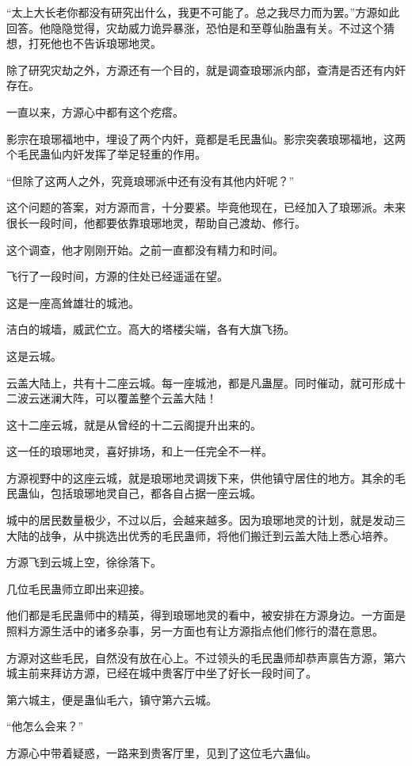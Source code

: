 \begin{this_body}
“太上大长老你都没有研究出什么，我更不可能了。总之我尽力而为罢。”方源如此回答。他隐隐觉得，灾劫威力诡异暴涨，恐怕是和至尊仙胎蛊有关。不过这个猜想，打死他也不告诉琅琊地灵。

除了研究灾劫之外，方源还有一个目的，就是调查琅琊派内部，查清是否还有内奸存在。

一直以来，方源心中都有这个疙瘩。

影宗在琅琊福地中，埋设了两个内奸，竟都是毛民蛊仙。影宗突袭琅琊福地，这两个毛民蛊仙内奸发挥了举足轻重的作用。

“但除了这两人之外，究竟琅琊派中还有没有其他内奸呢？”

这个问题的答案，对方源而言，十分要紧。毕竟他现在，已经加入了琅琊派。未来很长一段时间，他都要依靠琅琊地灵，帮助自己渡劫、修行。

这个调查，他才刚刚开始。之前一直都没有精力和时间。

飞行了一段时间，方源的住处已经遥遥在望。

这是一座高耸雄壮的城池。

洁白的城墙，威武伫立。高大的塔楼尖端，各有大旗飞扬。

这是云城。

云盖大陆上，共有十二座云城。每一座城池，都是凡蛊屋。同时催动，就可形成十二波云迷澜大阵，可以覆盖整个云盖大陆！

这十二座云城，就是从曾经的十二云阁提升出来的。

这一任的琅琊地灵，喜好排场，和上一任完全不一样。

方源视野中的这座云城，就是琅琊地灵调拨下来，供他镇守居住的地方。其余的毛民蛊仙，包括琅琊地灵自己，都各自占据一座云城。

城中的居民数量极少，不过以后，会越来越多。因为琅琊地灵的计划，就是发动三大陆的战争，从中挑选出优秀的毛民蛊师，将他们搬迁到云盖大陆上悉心培养。

方源飞到云城上空，徐徐落下。

几位毛民蛊师立即出来迎接。

他们都是毛民蛊师中的精英，得到琅琊地灵的看中，被安排在方源身边。一方面是照料方源生活中的诸多杂事，另一方面也有让方源指点他们修行的潜在意思。

方源对这些毛民，自然没有放在心上。不过领头的毛民蛊师却恭声禀告方源，第六城主前来拜访方源，已经在城中贵客厅中坐了好长一段时间了。

第六城主，便是蛊仙毛六，镇守第六云城。

“他怎么会来？”

方源心中带着疑惑，一路来到贵客厅里，见到了这位毛六蛊仙。


\end{this_body}

